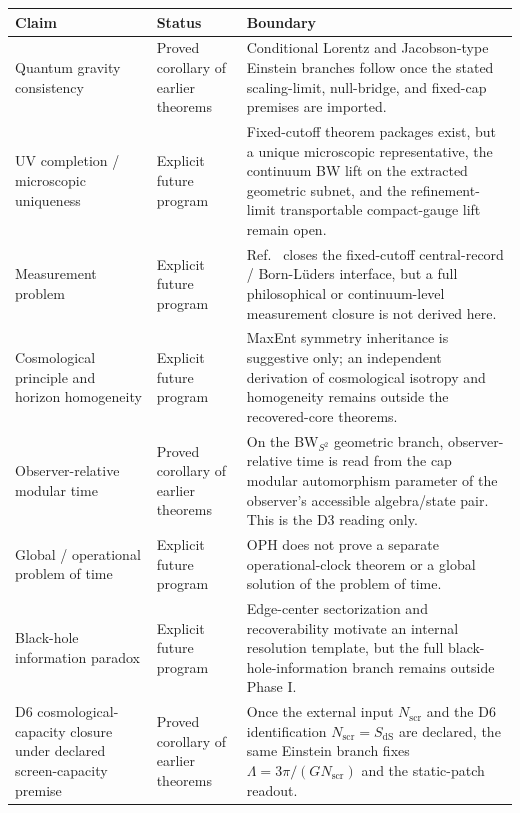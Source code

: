 \begin{center}
\scriptsize
\setlength{\tabcolsep}{3pt}
\begin{tabular}{@{}>{\raggedright\arraybackslash}p{}>{\raggedright\arraybackslash}p{}>{\raggedright\arraybackslash}p{}@{}}
\toprule
Claim & Status & Boundary \\
\midrule
Quantum gravity consistency & Proved corollary of earlier theorems & Conditional Lorentz and Jacobson-type Einstein branches follow once the stated scaling-limit, null-bridge, and fixed-cap premises are imported. \\
UV completion / microscopic uniqueness & Explicit future program & Fixed-cutoff theorem packages exist, but a unique microscopic representative, the continuum BW lift on the extracted geometric subnet, and the refinement-limit transportable compact-gauge lift remain open. \\
Measurement problem & Explicit future program & Ref.~\cite{ophmicrophysics} closes the fixed-cutoff central-record / Born-L\"uders interface, but a full philosophical or continuum-level measurement closure is not derived here. \\
Cosmological principle and horizon homogeneity & Explicit future program & MaxEnt symmetry inheritance is suggestive only; an independent derivation of cosmological isotropy and homogeneity remains outside the recovered-core theorems. \\
Observer-relative modular time & Proved corollary of earlier theorems & On the BW\(_{S^2}\) geometric branch, observer-relative time is read from the cap modular automorphism parameter of the observer's accessible algebra/state pair. This is the D3 reading only. \\
Global / operational problem of time & Explicit future program & OPH does not prove a separate operational-clock theorem or a global solution of the problem of time. \\
Black-hole information paradox & Explicit future program & Edge-center sectorization and recoverability motivate an internal resolution template, but the full black-hole-information branch remains outside Phase I. \\
D6 cosmological-capacity closure under declared screen-capacity premise & Proved corollary of earlier theorems & Once the external input \(N_{\mathrm{scr}}\) and the D6 identification \(N_{\mathrm{scr}}=S_{\mathrm{dS}}\) are declared, the same Einstein branch fixes \(\Lambda=3\pi/(G N_{\mathrm{scr}})\) and the static-patch readout. \\

\end{tabular}
\end{center}
